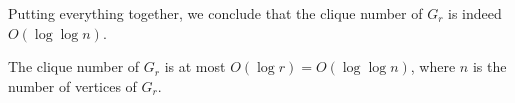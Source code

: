 %
%
Putting everything together, we conclude that the clique number of $ G_r $ is indeed $ O(\log \log n) $.
%
\begin{lemma}\label{lem:Gr_clique_loglogn}
    The clique number of $ G_r $ is at most $ O(\log r) = O(\log \log n) $, where $ n $ is the number of vertices of $ G_r $.
\end{lemma}
